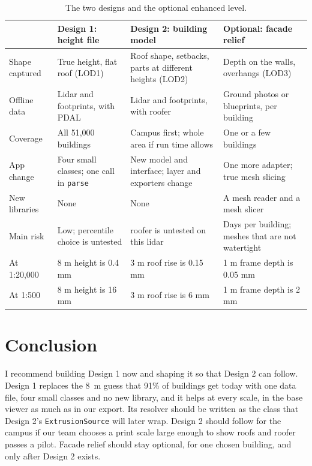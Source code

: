 \documentclass[11pt,letterpaper]{article}
\begin{document}
\begin{table}[H]
  \centering
  \small
  \caption{The two designs and the optional enhanced level.}
  \label{tab:compare}
  \begin{tabularx}{\textwidth}{@{}P{0.15\textwidth}LLL@{}}
    \toprule
     & Design 1: height file & Design 2: building model & Optional: facade relief \\
    \midrule
    Shape captured & True height, flat roof (LOD1) & Roof shape, setbacks, parts at different heights (LOD2) & Depth on the walls, overhangs (LOD3) \\
    \addlinespace[3pt]
    Offline data & Lidar and footprints, with PDAL & Lidar and footprints, with roofer & Ground photos or blueprints, per building \\
    \addlinespace[3pt]
    Coverage & All 51,000 buildings & Campus first; whole area if run time allows & One or a few buildings \\
    \addlinespace[3pt]
    App change & Four small classes; one call in \texttt{parse} & New model and interface; layer and exporters change & One more adapter; true mesh slicing \\
    \addlinespace[3pt]
    New libraries & None & None & A mesh reader and a mesh slicer \\
    \addlinespace[3pt]
    Main risk & Low; percentile choice is untested & roofer is untested on this lidar & Days per building; meshes that are not watertight \\
    \addlinespace[3pt]
    At 1:20,000 & 8 m height is 0.4 mm & 3 m roof rise is 0.15 mm & 1 m frame depth is 0.05 mm \\
    \addlinespace[3pt]
    At 1:500 & 8 m height is 16 mm & 3 m roof rise is 6 mm & 1 m frame depth is 2 mm \\
    \bottomrule
  \end{tabularx}
\end{table}

\section*{Conclusion}

I recommend building Design 1 now and shaping it so that Design 2 can follow. Design 1 replaces the 8~m guess that 91\% of buildings get today with one data file, four small classes and no new library, and it helps at every scale, in the base viewer as much as in our export. Its resolver should be written as the class that Design 2's \texttt{ExtrusionSource} will later wrap. Design 2 should follow for the campus if our team chooses a print scale large enough to show roofs and roofer passes a pilot. Facade relief should stay optional, for one chosen building, and only after Design 2 exists.
\end{document}
